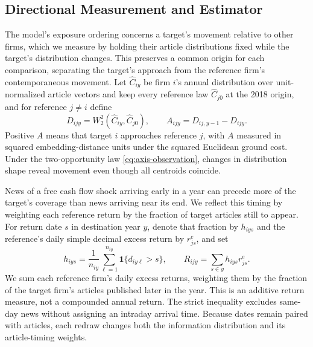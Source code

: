 \subsection{Directional Measurement and Estimator}\label{sec:adjustment-design}

The model's exposure ordering concerns a target's movement relative to other
firms, which we measure by holding their article distributions fixed while
the target's distribution changes.
This preserves a common origin for each comparison, separating the target's
approach from the reference firm's contemporaneous movement.
Let $\widehat C_{iy}$ be firm $i$'s annual distribution over unit-normalized
article vectors and keep every reference law $\widehat C_{j0}$ at the 2018
origin, and for reference $j\ne i$ define
\begin{equation}\label{eq:frozen-approach}
  D_{ijy}=W_2^2(\widehat C_{iy},\widehat C_{j0}),\qquad
  A_{ijy}=D_{ij,y-1}-D_{ijy}.
\end{equation}
Positive $A$ means that target $i$ approaches reference $j$, with $A$ measured
in squared embedding-distance units under the squared Euclidean ground cost.
Under the two-opportunity law \eqref{eq:axis-observation}, changes in
distribution shape reveal movement even though all centroids coincide.

News of a free cash flow shock arriving early in a year can precede more of
the target's coverage than news arriving near its end.
We reflect this timing by weighting each reference return by the fraction
of target articles still to appear.
For return date $s$ in destination year $y$, denote that fraction by
$h_{iys}$ and the reference's daily simple decimal excess return by
$r^e_{js}$, and set
\begin{equation}\label{eq:dated-financial}
  h_{iys}=\frac{1}{n_{iy}}\sum_{\ell=1}^{n_{iy}}
  \mathbf1\{d_{iy\ell}>s\},\qquad
  R_{ijy}=\sum_{s\in y}h_{iys}r^e_{js}.
\end{equation}
We sum each reference firm's daily excess returns, weighting them by the
fraction of the target firm's articles published later in the year.
This is an additive return measure, not a compounded annual return.
The strict inequality excludes same-day news without assigning an intraday
arrival time.
Because dates remain paired with articles, each redraw changes both the
information distribution and its article-timing weights.

